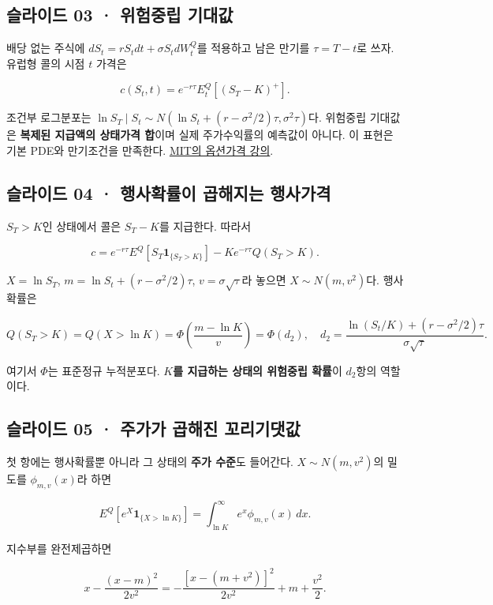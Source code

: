 \documentclass[11pt,a4paper]{article}
\begin{document}
\subsection{슬라이드 03 · 위험중립 기대값}
배당 없는 주식에 $dS_t=rS_tdt+\sigma S_tdW_t^Q$를 적용하고 남은 만기를 $\tau=T-t$로 쓰자. 유럽형 콜의 시점 $t$ 가격은\par

\[
c(S_t,t)=e^{-r\tau}E_t^Q[(S_T-K)^+].
\]

조건부 로그분포는 $\ln S_T\mid S_t\sim N(\ln S_t+(r-\sigma^2/2)\tau,\sigma^2\tau)$다. 위험중립 기대값은 \textbf{복제된 지급액의 상태가격 합}이며 실제 주가수익률의 예측값이 아니다. 이 표현은 기본 PDE와 만기조건을 만족한다. \href{https://ocw.mit.edu/courses/15-401-finance-theory-i-fall-2008/pages/video-lectures-and-slides/options/}{MIT의 옵션가격 강의}.\par

\subsection{슬라이드 04 · 행사확률이 곱해지는 행사가격}
$S_T>K$인 상태에서 콜은 $S_T-K$를 지급한다. 따라서\par

\[
c=e^{-r\tau}E^Q[S_T\mathbf1_{\{S_T>K\}}]
-Ke^{-r\tau}Q(S_T>K).
\]

$X=\ln S_T$, $m=\ln S_t+(r-\sigma^2/2)\tau$, $v=\sigma\sqrt\tau$라 놓으면 $X\sim N(m,v^2)$다. 행사확률은\par

\[
Q(S_T>K)=Q(X>\ln K)
=\Phi\!\left(\frac{m-\ln K}{v}\right)=\Phi(d_2),
\quad d_2=\frac{\ln(S_t/K)+(r-\sigma^2/2)\tau}{\sigma\sqrt\tau}.
\]

여기서 $\Phi$는 표준정규 누적분포다. \textbf{$K$를 지급하는 상태의 위험중립 확률}이 $d_2$항의 역할이다.\par

\subsection{슬라이드 05 · 주가가 곱해진 꼬리기댓값}
첫 항에는 행사확률뿐 아니라 그 상태의 \textbf{주가 수준}도 들어간다. $X\sim N(m,v^2)$의 밀도를 $\phi_{m,v}(x)$라 하면\par

\[
E^Q[e^X\mathbf1_{\{X>\ln K\}}]
=\int_{\ln K}^{\infty}e^x\phi_{m,v}(x)\,dx.
\]

지수부를 완전제곱하면\par

\[
x-\frac{(x-m)^2}{2v^2}
=-\frac{[x-(m+v^2)]^2}{2v^2}+m+\frac{v^2}{2}.
\]
\end{document}
